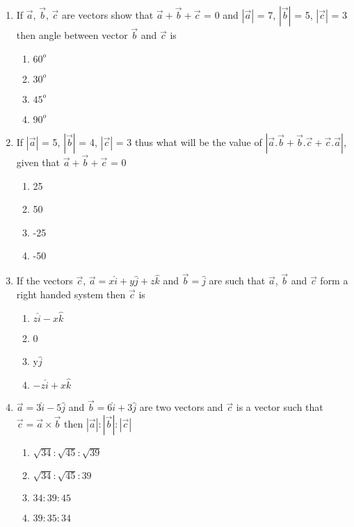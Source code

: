 \begin{enumerate}[label=\arabic*.,ref=\thesubsection.\theenumi]
\item If $\overrightarrow{a}$, $\overrightarrow{b}$, $\overrightarrow{c}$ are vectors show that $\overrightarrow{a} + \overrightarrow{b} + \overrightarrow{c}$ = 0 and $|\overrightarrow{a}|$ = 7, $|\overrightarrow{b}|$ = 5, 
$|\overrightarrow{c}|$ = 3 then angle between vector $\overrightarrow{b}$ and $\overrightarrow{c}$ is
\begin{enumerate}
\item $60^{o}$
\item $30^{o}$
\item $45^{o}$
\item $90^{o}$
\end{enumerate}

\item If $|\overrightarrow{a}|$ = 5, $|\overrightarrow{b}|$ = 4, $|\overrightarrow{c}|$ = 3 thus what will be the value of 
$|\overrightarrow{a}.\overrightarrow{b} + \overrightarrow{b}.\overrightarrow{c} + \overrightarrow{c}.\overrightarrow{a}|$, given that $\overrightarrow{a} + \overrightarrow{b} + \overrightarrow{c}$ = 0
\begin{enumerate}
\item 25
\item 50
\item -25
\item -50
\end{enumerate}

\item If the vectors $\overrightarrow{c}$, $\overrightarrow{a} = x\hat{i} + y\hat{j} + z\hat{k}$ and $\overrightarrow{b} = \hat{j}$ are such that $\overrightarrow{a}$, $\overrightarrow{b}$ and $\overrightarrow{c}$ form a right handed system then $\overrightarrow{c}$ is
\begin{enumerate}
\item $z\hat{i} - x\hat{k}$
\item 0
\item y$\hat{j}$
\item $-z\hat{i} + x\hat{k}$
\end{enumerate}

\item $\overrightarrow{a}=3\hat{i}-5\hat{j}$ and $\overrightarrow{b}=6\hat{i}+3\hat{j}$ are two vectors and $\overrightarrow{c}$ is a vector such that $\overrightarrow{c}=\overrightarrow{a} \times \overrightarrow{b}$ then 
$|\overrightarrow{a}|:|\overrightarrow{b}|:|\overrightarrow{c}|$
\begin{enumerate}
\item $\sqrt{34}:\sqrt{45}:\sqrt{39}$
\item $\sqrt{34}:\sqrt{45}:39$
\item $34:39:45$
\item $39:35:34$
\end{enumerate}


\end{enumerate}
